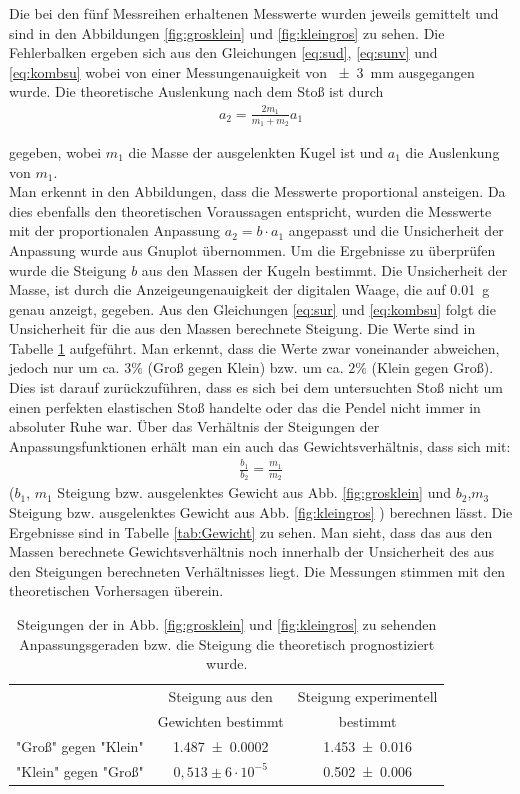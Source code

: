 Die bei den fünf Messreihen erhaltenen Messwerte wurden jeweils gemittelt und sind in den Abbildungen \ref{fig:grosklein} und \ref{fig:kleingros} zu sehen. Die Fehlerbalken ergeben sich aus den Gleichungen \ref{eq:sud}, \ref{eq:sunv} und \ref{eq:kombsu} wobei von einer Messungenauigkeit von \SI{+-3}{mm} ausgegangen wurde.
Die theoretische Auslenkung nach dem Stoß ist durch
\begin{align}
	a_2= \frac{2m_1}{m_1+m_2} a_1\label{eq:Auslenkung}
\end{align} 

gegeben, wobei $m_1$ die Masse der ausgelenkten Kugel ist und $a_1$ die Auslenkung von $m_1$.\\
Man erkennt in den Abbildungen, dass die Messwerte proportional ansteigen.
Da dies ebenfalls den theoretischen Voraussagen entspricht, wurden die Messwerte mit der proportionalen Anpassung $a_2=b \cdot a_1$ angepasst und die Unsicherheit der Anpassung wurde aus Gnuplot übernommen.
Um die Ergebnisse zu überprüfen wurde die Steigung $b$ aus den Massen der Kugeln bestimmt. Die Unsicherheit der Masse, ist durch die Anzeigeungenauigkeit der digitalen Waage, die auf \SI{0.01}{g} genau anzeigt, gegeben. Aus den Gleichungen \ref{eq:sur} und \ref{eq:kombsu} folgt die Unsicherheit für die aus den Massen berechnete Steigung. Die Werte sind in Tabelle \ref{tab:steigung} aufgeführt.
Man erkennt, dass die Werte zwar voneinander abweichen, jedoch nur um ca. $3\%$ (Groß gegen Klein) bzw. um ca. $2\%$ (Klein gegen Groß). Dies ist darauf zurückzuführen, dass es sich bei dem untersuchten Stoß nicht um einen perfekten elastischen Stoß handelte oder das die Pendel nicht immer in absoluter Ruhe war.
Über das Verhältnis der Steigungen der Anpassungsfunktionen erhält man ein auch das Gewichtsverhältnis, dass sich mit: 
\begin{align}
\frac{b_1}{b_2}=\frac{m_1}{m_2}	
\end{align} 
($b_1$, $m_1$ Steigung bzw. ausgelenktes Gewicht aus Abb. \ref{fig:grosklein} und $b_2$,$m_3$ Steigung bzw. ausgelenktes Gewicht aus Abb. \ref{fig:kleingros} ) berechnen lässt. Die Ergebnisse sind in Tabelle \ref{tab:Gewicht} zu sehen.
Man sieht, dass das aus den Massen berechnete Gewichtsverhältnis  noch innerhalb der Unsicherheit des aus den Steigungen berechneten Verhältnisses liegt. Die Messungen stimmen mit den theoretischen Vorhersagen überein.

\begin{table}[h]
	\caption{Steigungen der in Abb. \ref{fig:grosklein} und \ref{fig:kleingros} zu sehenden Anpassungsgeraden bzw. die Steigung die theoretisch prognostiziert wurde.}
	\begin{tabular}{|c|c|c|}
		\hline
		& Steigung aus den & Steigung experimentell\\
		& Gewichten bestimmt & bestimmt\\
		\hline
		"Groß" gegen "Klein" &  \SI{1,487+-0,0002}{} & \SI{1,453+-0,016}{} \\
		\hline
		"Klein" gegen "Groß" & $0,513 \pm 6 \cdot 10^{-5}$&\SI{0,502+-0,006}{}\\
		\hline
	\end{tabular}
\label{tab:steigung}
\end{table}

